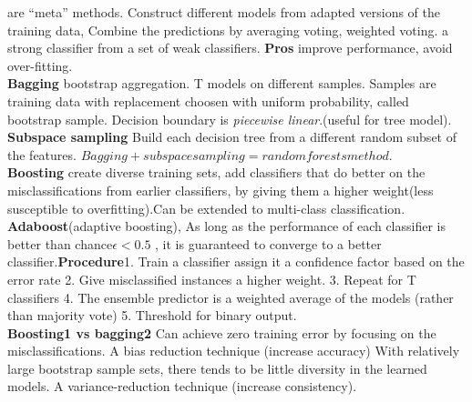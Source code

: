 \documentclass[cheatsheet.tex]{subfiles}
\begin{document}
are  “meta” methods. Construct different models from adapted versions of the training data, Combine the predictions by averaging voting, weighted voting. a strong classifier from a set of weak classifiers. \textbf{Pros} improve performance, avoid over-fitting. 
\\
\textbf{Bagging} bootstrap aggregation. T models on different samples. Samples are training data with replacement choosen with uniform probability, called bootstrap sample. Decision boundary is \textit{piecewise linear}.(useful for tree model). \textbf{Subspace sampling} Build each decision tree from a different random subset of the features. $Bagging + subspace sampling = random forests method$. 
\\
\textbf{Boosting} create diverse training sets, add classifiers that do better on the misclassifications from earlier classifiers, by giving them a higher weight(less susceptible to overfitting).Can be extended to multi-class classification. \textbf{Adaboost}(adaptive boosting), As long as the performance of each classifier is better than chance$\epsilon<0.5$ , it is guaranteed to converge to a better classifier.\textbf{Procedure}1. Train a classifier assign it a confidence factor based on the error rate 2. Give misclassified instances a higher weight. 3. Repeat for T classifiers 4. The ensemble predictor is a weighted average of the models (rather than majority vote) 5. Threshold for binary output.
\\
\textbf{Boosting1 vs bagging2}  Can achieve zero training error by focusing on the misclassifications. A bias reduction technique (increase accuracy)  With relatively large bootstrap sample sets, there tends to be little diversity in the learned models. A variance-reduction technique (increase consistency).
\\
\end{document}
